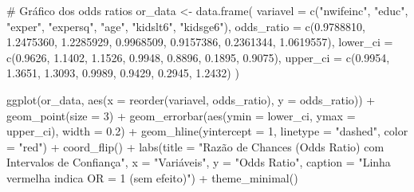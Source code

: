 \documentclass[
  letterpaper,
  DIV=11,
  numbers=noendperiod]{scrartcl}
\newenvironment{Shaded}{\begin{snugshade}}{\end{snugshade}}
\newcommand{\AttributeTok}[1]{\textcolor[rgb]{0.40,0.45,0.13}{#1}}
\newcommand{\CommentTok}[1]{\textcolor[rgb]{0.37,0.37,0.37}{#1}}
\newcommand{\DecValTok}[1]{\textcolor[rgb]{0.68,0.00,0.00}{#1}}
\newcommand{\FloatTok}[1]{\textcolor[rgb]{0.68,0.00,0.00}{#1}}
\newcommand{\FunctionTok}[1]{\textcolor[rgb]{0.28,0.35,0.67}{#1}}
\newcommand{\NormalTok}[1]{\textcolor[rgb]{0.00,0.23,0.31}{#1}}
\newcommand{\OtherTok}[1]{\textcolor[rgb]{0.00,0.23,0.31}{#1}}
\newcommand{\SpecialCharTok}[1]{\textcolor[rgb]{0.37,0.37,0.37}{#1}}
\newcommand{\StringTok}[1]{\textcolor[rgb]{0.13,0.47,0.30}{#1}}
\begin{document}
\begin{Shaded}
\begin{Highlighting}[]
\CommentTok{\# Gráfico dos odds ratios}
\NormalTok{or\_data }\OtherTok{\textless{}{-}} \FunctionTok{data.frame}\NormalTok{(}
  \AttributeTok{variavel =} \FunctionTok{c}\NormalTok{(}\StringTok{"nwifeinc"}\NormalTok{, }\StringTok{"educ"}\NormalTok{, }\StringTok{"exper"}\NormalTok{, }\StringTok{"expersq"}\NormalTok{, }\StringTok{"age"}\NormalTok{, }\StringTok{"kidslt6"}\NormalTok{, }\StringTok{"kidsge6"}\NormalTok{),}
  \AttributeTok{odds\_ratio =} \FunctionTok{c}\NormalTok{(}\FloatTok{0.9788810}\NormalTok{, }\FloatTok{1.2475360}\NormalTok{, }\FloatTok{1.2285929}\NormalTok{, }\FloatTok{0.9968509}\NormalTok{, }\FloatTok{0.9157386}\NormalTok{, }\FloatTok{0.2361344}\NormalTok{, }\FloatTok{1.0619557}\NormalTok{),}
  \AttributeTok{lower\_ci =} \FunctionTok{c}\NormalTok{(}\FloatTok{0.9626}\NormalTok{, }\FloatTok{1.1402}\NormalTok{, }\FloatTok{1.1526}\NormalTok{, }\FloatTok{0.9948}\NormalTok{, }\FloatTok{0.8896}\NormalTok{, }\FloatTok{0.1895}\NormalTok{, }\FloatTok{0.9075}\NormalTok{),}
  \AttributeTok{upper\_ci =} \FunctionTok{c}\NormalTok{(}\FloatTok{0.9954}\NormalTok{, }\FloatTok{1.3651}\NormalTok{, }\FloatTok{1.3093}\NormalTok{, }\FloatTok{0.9989}\NormalTok{, }\FloatTok{0.9429}\NormalTok{, }\FloatTok{0.2945}\NormalTok{, }\FloatTok{1.2432}\NormalTok{)}
\NormalTok{)}

\FunctionTok{ggplot}\NormalTok{(or\_data, }\FunctionTok{aes}\NormalTok{(}\AttributeTok{x =} \FunctionTok{reorder}\NormalTok{(variavel, odds\_ratio), }\AttributeTok{y =}\NormalTok{ odds\_ratio)) }\SpecialCharTok{+}
  \FunctionTok{geom\_point}\NormalTok{(}\AttributeTok{size =} \DecValTok{3}\NormalTok{) }\SpecialCharTok{+}
  \FunctionTok{geom\_errorbar}\NormalTok{(}\FunctionTok{aes}\NormalTok{(}\AttributeTok{ymin =}\NormalTok{ lower\_ci, }\AttributeTok{ymax =}\NormalTok{ upper\_ci), }\AttributeTok{width =} \FloatTok{0.2}\NormalTok{) }\SpecialCharTok{+}
  \FunctionTok{geom\_hline}\NormalTok{(}\AttributeTok{yintercept =} \DecValTok{1}\NormalTok{, }\AttributeTok{linetype =} \StringTok{"dashed"}\NormalTok{, }\AttributeTok{color =} \StringTok{"red"}\NormalTok{) }\SpecialCharTok{+}
  \FunctionTok{coord\_flip}\NormalTok{() }\SpecialCharTok{+}
  \FunctionTok{labs}\NormalTok{(}\AttributeTok{title =} \StringTok{"Razão de Chances (Odds Ratio) com Intervalos de Confiança"}\NormalTok{,}
       \AttributeTok{x =} \StringTok{"Variáveis"}\NormalTok{,}
       \AttributeTok{y =} \StringTok{"Odds Ratio"}\NormalTok{,}
       \AttributeTok{caption =} \StringTok{"Linha vermelha indica OR = 1 (sem efeito)"}\NormalTok{) }\SpecialCharTok{+}
  \FunctionTok{theme\_minimal}\NormalTok{()}
\end{Highlighting}
\end{Shaded}
\end{document}
